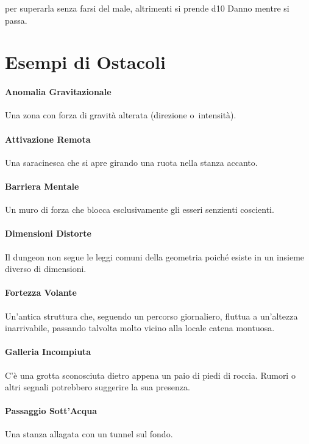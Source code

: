 \documentclass[itdr]{subfiles}
\begin{document}
 per superarla senza farsi del male, altrimenti si prende d10 Danno mentre si passa.

\vfill
\break

\section{Esempi di Ostacoli}

\paragraph{Anomalia Gravitazionale}
Una zona con forza di gravità alterata (direzione o~intensità).

\vfill
\paragraph{Attivazione Remota}
Una saracinesca che si apre girando una ruota nella stanza accanto.

\vfill
\paragraph{Barriera Mentale}
Un muro di forza che blocca esclusivamente gli esseri senzienti coscienti.

\vfill
\paragraph{Dimensioni Distorte}
Il dungeon non segue le leggi comuni della geometria poiché esiste in un insieme diverso di dimensioni.

\vfill
\paragraph{Fortezza Volante}
Un'antica struttura che, seguendo un percorso giornaliero, fluttua a un'altezza inarrivabile, passando talvolta molto vicino alla locale catena montuosa.

\vfill
\paragraph{Galleria Incompiuta}
C'è una grotta sconosciuta dietro appena un paio di piedi di roccia. Rumori o altri segnali potrebbero suggerire la sua presenza.

\vfill
\paragraph{Passaggio Sott'Acqua}
Una stanza allagata con un tunnel sul fondo.
\end{document}
